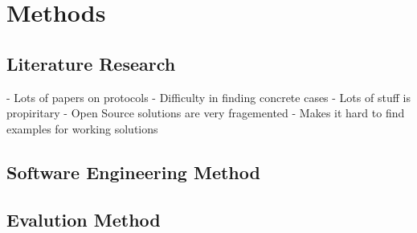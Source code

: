 \chapter{\label{methods}Methods}
\thispagestyle{fancy}

\section{Literature Research}

- Lots of papers on protocols
- Difficulty in finding concrete cases
- Lots of stuff is propiritary
  - Open Source solutions are very fragemented
  - Makes it hard to find examples for working solutions

\section{Software Engineering Method}

\section{Evalution Method}